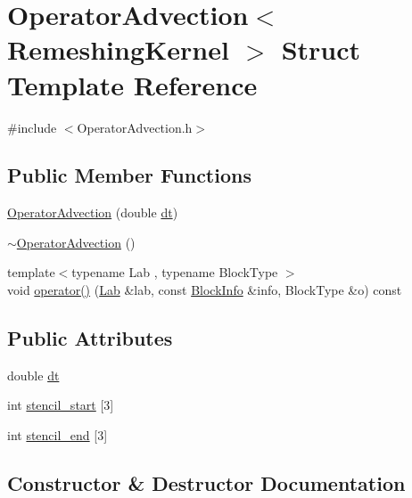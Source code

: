 \hypertarget{struct_operator_advection}{}\section{Operator\+Advection$<$ Remeshing\+Kernel $>$ Struct Template Reference}
\label{struct_operator_advection}


{\ttfamily \#include $<$Operator\+Advection.\+h$>$}

\subsection*{Public Member Functions}
\begin{DoxyCompactItemize}
\item 
\hyperlink{struct_operator_advection_a174044f2ff03c8d58e44b9d89dfaa4f8}{Operator\+Advection} (double \hyperlink{struct_operator_advection_a4a8f1b38860f0d05f233493c70654006}{dt})
\item 
\hyperlink{struct_operator_advection_a29553dba616cbabc01b4a6f29469c08c}{$\sim$\+Operator\+Advection} ()
\item 
{\footnotesize template$<$typename Lab , typename Block\+Type $>$ }\\void \hyperlink{struct_operator_advection_a15dcc82744e11ed8f0a741e0143dbeac}{operator()} (\hyperlink{_definitions_8h_ad6f951af9a2a6ebc1975404882b34314}{Lab} \&lab, const \hyperlink{struct_block_info}{Block\+Info} \&info, Block\+Type \&o) const 
\end{DoxyCompactItemize}
\subsection*{Public Attributes}
\begin{DoxyCompactItemize}
\item 
double \hyperlink{struct_operator_advection_a4a8f1b38860f0d05f233493c70654006}{dt}
\item 
int \hyperlink{struct_operator_advection_ae312bcebfc0be505d739796831a90648}{stencil\+\_\+start} \mbox{[}3\mbox{]}
\item 
int \hyperlink{struct_operator_advection_af466cff8bcff47aa746cd5060fe4919d}{stencil\+\_\+end} \mbox{[}3\mbox{]}
\end{DoxyCompactItemize}


\subsection{Constructor \& Destructor Documentation}
\hypertarget{struct_operator_advection_a174044f2ff03c8d58e44b9d89dfaa4f8}{}
